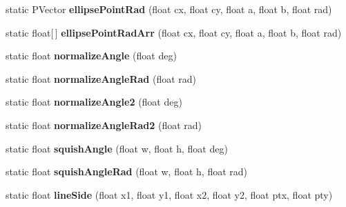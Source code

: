 \begin{DoxyCompactItemize}
\item 
\hypertarget{classhype_1_1util_1_1_h_math_abb716f00b9b50fba0195e964bc976804}{static P\-Vector {\bfseries ellipse\-Point\-Rad} (float cx, float cy, float a, float b, float rad)}\label{classhype_1_1util_1_1_h_math_abb716f00b9b50fba0195e964bc976804}

\item 
\hypertarget{classhype_1_1util_1_1_h_math_a0ed7dff059ec1f5e67ed231e715f030d}{static float\mbox{[}$\,$\mbox{]} {\bfseries ellipse\-Point\-Rad\-Arr} (float cx, float cy, float a, float b, float rad)}\label{classhype_1_1util_1_1_h_math_a0ed7dff059ec1f5e67ed231e715f030d}

\item 
\hypertarget{classhype_1_1util_1_1_h_math_aa641b5124a8cc29ff96c589a3add2135}{static float {\bfseries normalize\-Angle} (float deg)}\label{classhype_1_1util_1_1_h_math_aa641b5124a8cc29ff96c589a3add2135}

\item 
\hypertarget{classhype_1_1util_1_1_h_math_ae4d6fb62a48211c091adad7ef17b17ac}{static float {\bfseries normalize\-Angle\-Rad} (float rad)}\label{classhype_1_1util_1_1_h_math_ae4d6fb62a48211c091adad7ef17b17ac}

\item 
\hypertarget{classhype_1_1util_1_1_h_math_a81ea5767bc6ed1234e6e625225464a12}{static float {\bfseries normalize\-Angle2} (float deg)}\label{classhype_1_1util_1_1_h_math_a81ea5767bc6ed1234e6e625225464a12}

\item 
\hypertarget{classhype_1_1util_1_1_h_math_aeca5cf9d68d98d9e482f14898ad45f28}{static float {\bfseries normalize\-Angle\-Rad2} (float rad)}\label{classhype_1_1util_1_1_h_math_aeca5cf9d68d98d9e482f14898ad45f28}

\item 
\hypertarget{classhype_1_1util_1_1_h_math_ad24eeeb91cf12760e49edd64b389bf9a}{static float {\bfseries squish\-Angle} (float w, float h, float deg)}\label{classhype_1_1util_1_1_h_math_ad24eeeb91cf12760e49edd64b389bf9a}

\item 
\hypertarget{classhype_1_1util_1_1_h_math_aa290e50e2e3d2d1a3d1db765e64b213c}{static float {\bfseries squish\-Angle\-Rad} (float w, float h, float rad)}\label{classhype_1_1util_1_1_h_math_aa290e50e2e3d2d1a3d1db765e64b213c}

\item 
\hypertarget{classhype_1_1util_1_1_h_math_a8f87a7884529c76809f9b0b745a9954a}{static float {\bfseries line\-Side} (float x1, float y1, float x2, float y2, float ptx, float pty)}\label{classhype_1_1util_1_1_h_math_a8f87a7884529c76809f9b0b745a9954a}


\end{DoxyCompactItemize}
